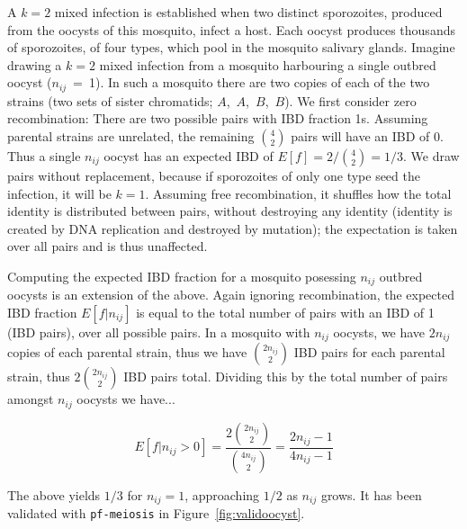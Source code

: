 \documentclass[9pt,lineno]{elife}
\begin{document}
A $k=2$ mixed infection is established when two distinct sporozoites, produced from the oocysts of this mosquito, infect a host. Each oocyst produces thousands of sporozoites, of four types, which pool in the mosquito salivary glands. Imagine drawing a $k=2$ mixed infection from a mosquito harbouring a single outbred oocyst ($n_{ij}$~=~1). In such a mosquito there are two copies of each of the two strains (two sets of sister chromatids; $A$,~$A$,~$B$,~$B$). We first consider zero recombination: There are two possible pairs with IBD fraction 1s. Assuming parental strains are unrelated, the remaining ${4 \choose 2}$ pairs will have an IBD of 0. Thus a single $n_{ij}$ oocyst has an expected IBD of $E[f]= 2/{4 \choose 2} = 1/3$. We draw pairs without replacement, because if sporozoites of only one type seed the infection, it will be $k=1$. Assuming free recombination, it shuffles how the total identity is distributed between pairs, without destroying any identity (identity is created by DNA replication and destroyed by mutation); the expectation is taken over all pairs and is thus unaffected.

Computing the expected IBD fraction for a mosquito posessing $n_{ij}$ outbred oocysts is an extension of the above. Again ignoring recombination, the expected IBD fraction $E[f|n_{ij}]$ is equal to the total number of pairs with an IBD of 1 (IBD pairs), over all possible pairs. In a mosquito with $n_{ij}$ oocysts, we have $2n_{ij}$ copies of each parental strain, thus we have ${2n_{ij} \choose 2}$ IBD pairs for each parental strain, thus $2 {2n_{ij} \choose 2}$ IBD pairs total. Dividing this by the total number of pairs amongst $n_{ij}$ oocysts we have...

\begin{equation} \label{eq1}
E[f|n_{ij} > 0] = \frac{2{2n_{ij} \choose 2}}{{4n_{ij} \choose 2}} = \frac{2n_{ij} - 1}{4n_{ij} - 1}
\end{equation}

The above yields $1/3$ for $n_{ij}=1$, approaching $1/2$ as $n_{ij}$ grows. It has been validated with \texttt{pf-meiosis} in Figure~\ref{fig:validoocyst}.
\end{document}
